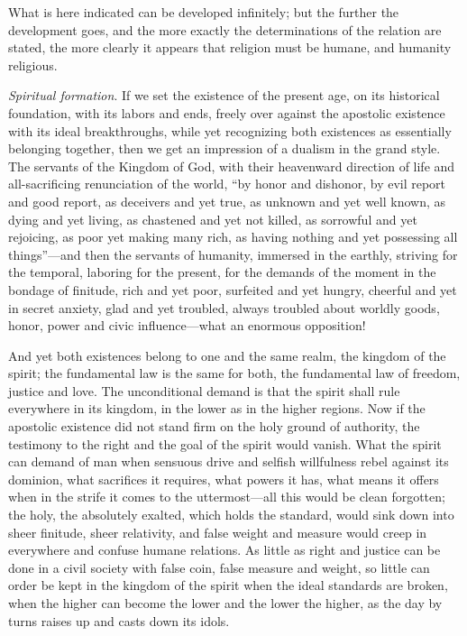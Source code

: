 \documentclass[12pt,a4paper,openany]{book}
\newcommand{\opage}[1]{\marginnote{\footnotesize\textit{[#1]}}}
\begin{document}
What is here indicated can be developed infinitely; but the further the
development goes, and the more exactly the determinations of the relation
are stated, the more clearly it appears that religion must be humane, and
humanity religious.

\emph{Spiritual formation}. If we set the existence of the present age, on
its historical foundation, with its labors and ends, freely over against
the apostolic existence with its ideal breakthroughs, while yet
recognizing both existences as essentially belonging together, then we
get an impression of a dualism in the grand style. The servants of the
Kingdom of God, with their heavenward direction of life and all-sacrificing
renunciation of the world, ``by honor and dishonor, by evil report and
good report, as deceivers and yet true, as unknown and yet well known, as
dying and yet living, as chastened and yet not killed, as sorrowful and
yet rejoicing, as poor yet making many rich, as having nothing and yet
possessing all things''---and then the servants of humanity, immersed in
the earthly, striving for the temporal, laboring for the present, for the
demands of the moment in the bondage of finitude, rich and yet poor,
surfeited and yet hungry, cheerful and yet in secret anxiety, glad and yet
troubled, always troubled about worldly goods, honor, power and civic
influence---what an enormous opposition!

And yet both existences belong to one and the same realm, the kingdom of
the spirit; the fundamental law is the same for both, the fundamental law
of freedom, justice and love. The unconditional demand is that the spirit
shall rule everywhere in its kingdom, in the lower as \opage{108}in the higher
regions. Now if the apostolic existence did not stand firm on the holy
ground of authority, the testimony to the right and the goal of the
spirit would vanish. What the spirit can demand of man when sensuous drive
and selfish willfulness rebel against its dominion, what sacrifices it
requires, what powers it has, what means it offers when in the strife it
comes to the uttermost---all this would be clean forgotten; the holy, the
absolutely exalted, which holds the standard, would sink down into sheer
finitude, sheer relativity, and false weight and measure would creep in
everywhere and confuse humane relations. As little as right and justice
can be done in a civil society with false coin, false measure and weight,
so little can order be kept in the kingdom of the spirit when the ideal
standards are broken, when the higher can become the lower and the lower
the higher, as the day by turns raises up and casts down its idols.
\end{document}
